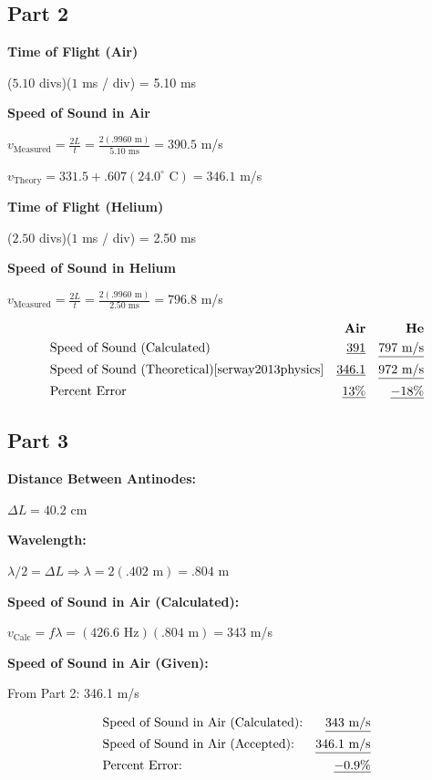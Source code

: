 \documentclass[twocolumn,english]{IEEEtran}
\theoremstyle{plain}
\theoremstyle{plain}
\begin{document}
\subsection*{Part 2}

\textbf{Time of Flight (Air)}

($5.10$ divs)($1$ ms / div) = 5.10 ms

\textbf{Speed of Sound in Air}

$v_{\text{Measured}}=\frac{2L}{t}=\frac{2(.9960\text{ m})}{5.10\text{ ms}} = 390.5$ m/s

$v_{\text{Theory}} = 331.5 + .607(24.0^{\circ}\text{ C}) = 346.1$ m/s

\textbf{Time of Flight (Helium)}

($2.50$ divs)($1$ ms / div) = 2.50 ms

\textbf{Speed of Sound in Helium}

$v_{\text{Measured}}=\frac{2L}{t}=\frac{2(.9960\text{ m})}{2.50\text{ ms}} = 796.8$ m/s


\noindent\hrulefill
\begin{align*}
 &					&\text{\textbf{Air}}	&	&\text{\textbf{He}}	\\
 &\text{Speed of Sound (Calculated)} 	&\text{\underline{$391$}} &	&\text{\underline{$797$ m/s}} \\
 &\text{Speed of Sound (Theoretical)\cite{serway2013physics}} 	&\text{\underline{$346.1$}} &	&\text{\underline{$972$ m/s}} \\
 &\text{Percent Error}			&\text{\underline{$13\%$}}	&	&\text{\underline{$-18\%$}}
\end{align*}
\noindent\hrulefill

\subsection*{Part 3} %
\textbf{Distance Between Antinodes: }

$\Delta L = 40.2$ cm

\textbf{Wavelength: }

$\lambda/2 = \Delta L \Rightarrow \lambda = 2(.402\text{ m}) = .804$ m

\textbf{Speed of Sound in Air (Calculated): }

$v_{\text{Calc}} = f\lambda = (426.6\text{ Hz})(.804\text{ m}) = 343$ m/s

\textbf{Speed of Sound in Air (Given): }

From Part 2: 346.1 m/s

\noindent\hrulefill
\begin{align*}
 &\text{Speed of Sound in Air (Calculated):}	&\text{\underline{$343$ m/s}} \\
 &\text{Speed of Sound in Air (Accepted):}	&\text{\underline{$346.1$ m/s}} \\
 &\text{Percent Error:}				&\text{\underline{$-0.9 \%$}}
\end{align*}
\noindent\hrulefill
\end{document}
